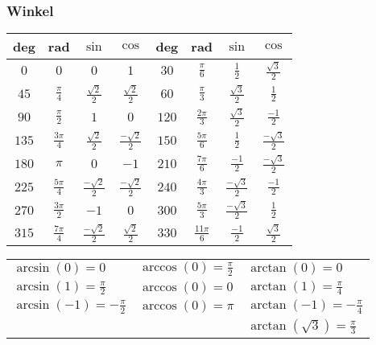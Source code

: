 \subsubsection{Winkel}
\begin{tabular}{c c c c || c c c c}
    deg   & rad                & $\sin$                 & $\cos$                  & deg & rad & $\sin$ & $\cos$\\\hline
    $0$   & $0$                & $0$                    & $1$                     &
    $30$  & $\frac{\pi}{6}$    & $\frac{1}{2}$          & $\frac{\sqrt{3}}{2}$\\
    $45$  & $\frac{\pi}{4}$    & $\frac{\sqrt{2}}{2}$   & $\frac{\sqrt{2}}{2}$    &
    $60$  & $\frac{\pi}{3}$    & $\frac{\sqrt{3}}{2}$   & $\frac{1}{2}$\\
    $90$  & $\frac{\pi}{2}$    & $1$                    & $0$                     &
    $120$ & $\frac{2\pi}{3}$   & $\frac{\sqrt{3}}{2} $  & $\frac{-1}{2}$\\
    $135$ & $\frac{3 \pi}{4}$  & $\frac{\sqrt{2}}{2}$   & $\frac{-\sqrt{2}}{2}$   &
    $150$ & $\frac{5 \pi}{6}$  & $\frac{1}{2}$          & $\frac{-\sqrt{3}}{2}$\\
    $180$ & $\pi$              & $0$                    & $-1$                    &
    $210$ & $\frac{7\pi}{6}$   & $\frac{-1}{2}$         & $\frac{-\sqrt{3}}{2}$\\
    $225$ & $\frac{5\pi}{4}$   & $\frac{-\sqrt{2}}{2}$  & $\frac{-\sqrt{2}}{2}$   &
    $240$ & $\frac{4\pi}{3}$   & $\frac{-\sqrt{3}}{2}$  & $\frac{-1}{2}$\\
    $270$ & $\frac{3 \pi}{2}$  & $-1$                   & $0$                     &
    $300$ & $\frac{5 \pi}{3}$  & $\frac{-\sqrt{3}}{2} $ & $\frac{1}{2}$\\
    $315$ & $\frac{7 \pi}{4}$  & $\frac{-\sqrt{2}}{2} $ & $\frac{\sqrt{2}}{2}$    &
    $330$ & $\frac{11 \pi}{6}$ & $\frac{-1}{2} $        & $\frac{\sqrt{3}}{2}$\\
\end{tabular}

\begin{tabular}{l | l | l}
    $\arcsin(0) = 0$                & $\arccos(0) = \frac{\pi}{2}$ & $\arctan(0) = 0$\\
    $\arcsin(1) = \frac{\pi}{2}$    & $\arccos(0) = 0$             & $\arctan(1) = \frac{\pi}{4}$\\
    $\arcsin(-1) = -\frac{\pi}{2}$  & $\arccos(0) = \pi$           & $\arctan(-1) = -\frac{\pi}{4}$\\
                                    &                               & $\arctan(\sqrt{3}) = \frac{\pi}{3}$\\
\end{tabular}

